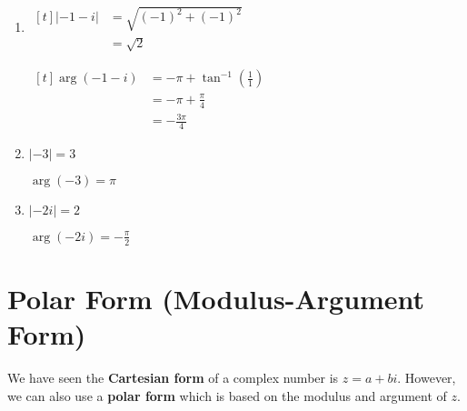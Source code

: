 \documentclass[11pt,a4paper]{book}
\begin{document}
\begin{example}
\begin{enumerate}[label=(\alph*)]
\item

\begin{minipage}[t]{0.3\textwidth}
$
\begin{aligned}[t]
\left|-1-i\right| & =\sqrt{\left(-1\right)^{2}+\left(-1\right)^{2}}\\
 & =\sqrt{2}
\end{aligned}
$

\end{minipage}
\begin{minipage}[t]{0.3\textwidth}

$
\begin{aligned}[t]
\arg\left(-1-i\right) & =-\pi+\tan^{-1}\left(\frac{1}{1}\right)\\
 & =-\pi+\frac{\pi}{4}\\
 & =-\frac{3\pi}{4}
\end{aligned}
$

\end{minipage}

\item

\begin{minipage}[t]{0.3\textwidth}
$\left|-3\right|=3$


\end{minipage}
\begin{minipage}[t]{0.3\textwidth}
$\arg\left(-3\right)=\pi$

\end{minipage}

\item

\begin{minipage}[t]{0.3\textwidth}
$\left|-2i\right|=2$

\end{minipage}
\begin{minipage}[t]{0.3\textwidth}
$\arg\left(-2i\right)=-\frac{\pi}{2}$
\end{minipage}

\end{enumerate}

\end{example}

\section{Polar Form (Modulus-Argument Form)}

We have seen the \textbf{Cartesian form }of a complex number is $z=a+bi$.
However, we can also use a \textbf{polar form }which is based on the
modulus and argument of $z$.
\end{document}
